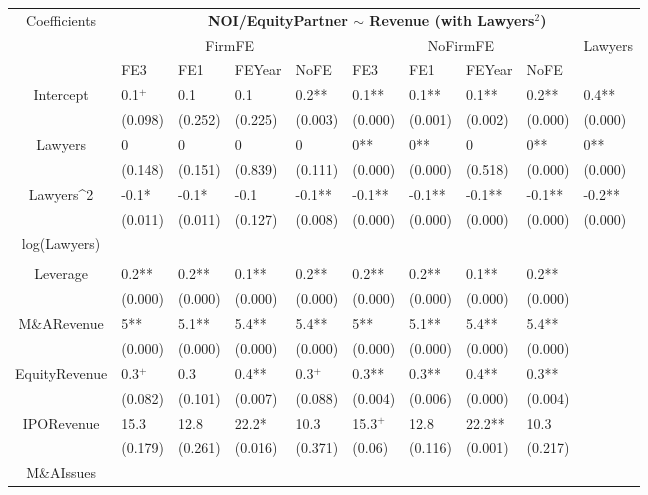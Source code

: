 \documentclass{article}
\begin{document}
\begin{table}[H]
\centering
\begin{tabular}{|clllllllll|}
\hline
\multirow{3}{*}{Coefficients} & \multicolumn{9}{c|}{\textbf{NOI/EquityPartner $\sim$ Revenue (with Lawyers$^2$)}} \\
\cline{2-10}
& \multicolumn{4}{c}{FirmFE} & \multicolumn{4}{c}{NoFirmFE} & \multirow{2}{*}{Lawyers} \\
\cline{2-9}
& FE3 & FE1 & FEYear & NoFE & FE3 & FE1 & FEYear & NoFE &  \\
\hline
 
Intercept & 0.1$^{+}$ & 0.1 & 0.1 & 0.2** & 0.1** & 0.1** & 0.1** & 0.2** & 0.4** \\ 
   & (0.098) & (0.252) & (0.225) & (0.003) & (0.000) & (0.001) & (0.002) & (0.000) & (0.000) \\ 
  Lawyers & 0 & 0 & 0 & 0 & 0** & 0** & 0 & 0** & 0** \\ 
   & (0.148) & (0.151) & (0.839) & (0.111) & (0.000) & (0.000) & (0.518) & (0.000) & (0.000) \\ 
  Lawyers^2 & -0.1* & -0.1* & -0.1 & -0.1** & -0.1** & -0.1** & -0.1** & -0.1** & -0.2** \\ 
   & (0.011) & (0.011) & (0.127) & (0.008) & (0.000) & (0.000) & (0.000) & (0.000) & (0.000) \\ 
  log(Lawyers) &  &  &  &  &  &  &  &  &  \\ 
   &  &  &  &  &  &  &  &  &  \\ 
  Leverage & 0.2** & 0.2** & 0.1** & 0.2** & 0.2** & 0.2** & 0.1** & 0.2** &  \\ 
   & (0.000) & (0.000) & (0.000) & (0.000) & (0.000) & (0.000) & (0.000) & (0.000) &  \\ 
  M\&ARevenue & 5** & 5.1** & 5.4** & 5.4** & 5** & 5.1** & 5.4** & 5.4** &  \\ 
   & (0.000) & (0.000) & (0.000) & (0.000) & (0.000) & (0.000) & (0.000) & (0.000) &  \\ 
  EquityRevenue & 0.3$^{+}$ & 0.3 & 0.4** & 0.3$^{+}$ & 0.3** & 0.3** & 0.4** & 0.3** &  \\ 
   & (0.082) & (0.101) & (0.007) & (0.088) & (0.004) & (0.006) & (0.000) & (0.004) &  \\ 
  IPORevenue & 15.3 & 12.8 & 22.2* & 10.3 & 15.3$^{+}$ & 12.8 & 22.2** & 10.3 &  \\ 
   & (0.179) & (0.261) & (0.016) & (0.371) & (0.06) & (0.116) & (0.001) & (0.217) &  \\ 
  M\&AIssues &  &  &  &  &  &  &  &  &  \\ 

\end{tabular}
\end{table}
\end{document}
